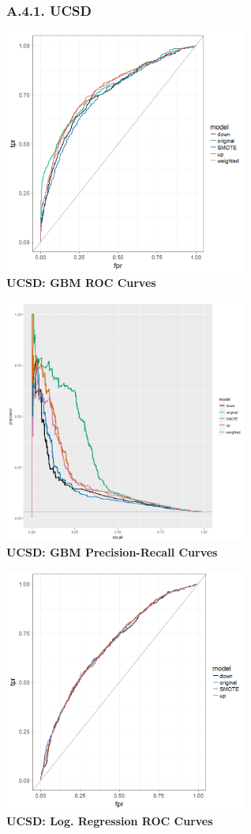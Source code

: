 \documentclass[12pt,]{article}
\begin{document}
\hypertarget{a.4.1.-ucsd}{%
\subsubsection{A.4.1. UCSD}\label{a.4.1.-ucsd}}

\center

\includegraphics[width=0.6\textwidth,height=\textheight]{figures/ucsd/ucsd_gbm_rocs.png}\\
\textbf{UCSD: GBM ROC Curves}

\includegraphics[width=0.6\textwidth,height=\textheight]{figures/ucsd/ucsd_gbm_PR.png}\\
\textbf{UCSD: GBM Precision-Recall Curves}

\includegraphics[width=0.6\textwidth,height=\textheight]{figures/ucsd/ucsd_glm_rocs.png}\\
\textbf{UCSD: Log. Regression ROC Curves}
\end{document}
